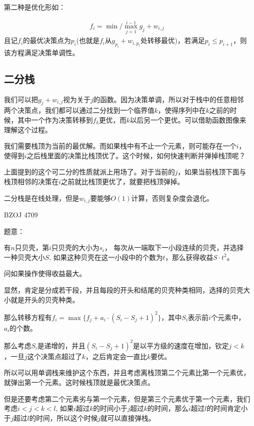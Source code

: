 第二种是优化形如：

\begin{eqnarray*}
f_i=\min/\max_{j=1}^{i-1} g_j+w_{i,j}
\end{eqnarray*}
且记$f_i$的最优决策点为$p_i$(也就是$f_i$从$g_{p_i} + w_{i, p_i}$处转移最优)，若满足$p_i \leq p_{i + 1}$，则该方程满足决策单调性。\par


\subsection{二分栈}

我们可以把$g_j+w_{i,j}$视为关于$j$的函数。因为决策单调，所以对于栈中的任意相邻两个决策点，我们都可以通过二分找到一个临界值$k$，使得序列中在$k$之前的时候，其中一个作为决策转移到$f_k$更优，而$k$以后另一个更优。可以借助函数图像来理解这个过程。\par

我们需要栈顶为当前的最优解。而如果栈中有不止一个元素，则可能存在一个$i$，使得到$i$之后栈里面的决策比栈顶优了。这个时候，如何快速判断并弹掉栈顶呢？\par

上面提到的这个可二分的性质就派上用场了。对于当前的$j$，如果当前栈顶下面与栈顶相邻的决策在$i$之前就比栈顶更优了，就要把栈顶弹掉。\par

二分栈是在线处理，但是$w_{i, j}$要能够$O(1)$计算，否则复杂度会退化。

BZOJ 4709\par

题意：\par
有$n$只贝壳，第$i$只贝壳的大小为$s_i$， 每次从一端取下一小段连续的贝壳，并选择一种贝壳大小$S$, 如果这种贝壳在这一小段中的个数为$t$，那么获得收益$S \cdot t^2$。\par
问如果操作使得收益最大。\par

显然，肯定是分成若干段，并且每段的开头和结尾的贝壳种类相同，选择的贝壳大小就是开头的贝壳种类。\par
那么转移方程有$\displaystyle f_i = \max \{f_j + a_i \cdot (S_i - S_j + 1)^2\}$，其中$S_i$表示前$i$个元素中，$a_i$的个数。\par
那么考虑$S_i$是递增的，并且$(S_i - S_j + 1)^2$是以平方级的速度在增加，钦定$j < k$，一旦$j$这个决策点超过了$k$，之后肯定会一直比$k$要优。\par
所以可以用单调栈来维护这个东西，并且考虑离栈顶第二个元素比第一个元素优，就弹出第一个元素。这时候栈顶就是最优决策点。\par
但是还要考虑第二个元素劣与第一个元素，但是第三个元素优于第一个元素，我们考虑$i < j < k < l$, 如果$i$超过$k$的时间小于$j$超过$k$的时间，那么$i$超过$l$的时间肯定小于$j$超过$l$的时间，所以这个时候$j$就可以直接弹栈。\par


